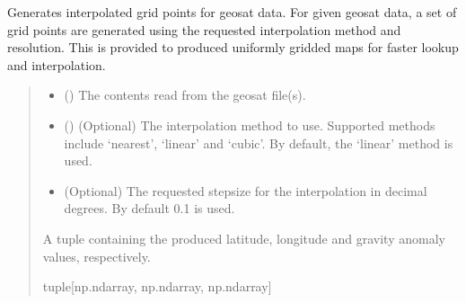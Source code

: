 \documentclass[letterpaper,10pt,english]{sphinxmanual}
\begin{document}
\begin{fulllineitems}
\label{\detokenize{modules/gravity/geosat:qnav.gravity.geosat.create_interp_grid}}
\pysigstartsignatures
{}
\pysigstopsignatures
\sphinxAtStartPar
Generates interpolated grid points for geosat data.
For given geosat data, a set of grid points are generated using the
requested interpolation method and resolution. This is provided to
produced uniformly gridded maps for faster look\sphinxhyphen{}up and interpolation.
\begin{quote}\begin{description}
\begin{itemize}
\item {} 
\sphinxAtStartPar
{} (\sphinxstyleliteralemphasis{\sphinxupquote{{[}}}\sphinxstyleliteralemphasis{\sphinxupquote{, }}\sphinxstyleliteralemphasis{\sphinxupquote{{]}}}) \textendash{} The contents read from the geosat file(s).

\item {} 
\sphinxAtStartPar
{} () \textendash{} (Optional) The interpolation method to use.
Supported methods include ‘nearest’, ‘linear’ and ‘cubic’.
By default, the ‘linear’ method is used.

\item {} 
\sphinxAtStartPar
{} \textendash{} (Optional) The requested step\sphinxhyphen{}size for the
interpolation in decimal degrees. By default 0.1 is used.

\end{itemize}

\sphinxAtStartPar
A tuple containing the produced latitude, longitude and gravity
anomaly values, respectively.

\sphinxAtStartPar
tuple{[}np.ndarray, np.ndarray, np.ndarray{]}

\end{description}\end{quote}

\end{fulllineitems}
\end{document}
